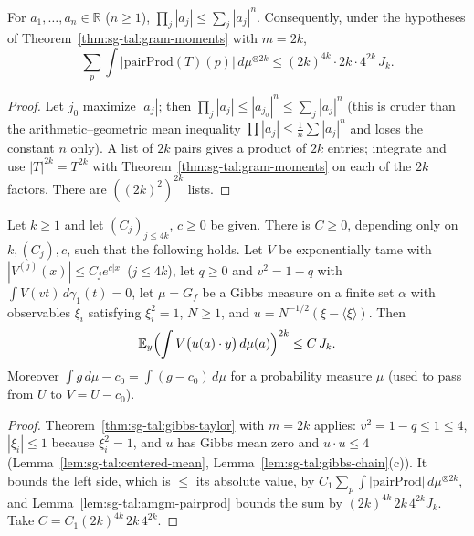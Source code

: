 \begin{lemma}
\label{lem:sg-tal:amgm-pairprod}
  \leanok
{}
For $a_1,\dots,a_n\in\mathbb R$ ($n\ge1$), $\prod_j|a_j|\le\sum_j|a_j|^n$.  Consequently, under the hypotheses of Theorem~\ref{thm:sg-tal:gram-moments} with $m=2k$,
\[
\sum_{p}\int\bigl|\mathrm{pairProd}(T)(p)\bigr|\,d\mu^{\otimes2k}\le(2k)^{4k}\cdot2k\cdot4^{2k}\,J_k .
\]
\end{lemma}
\begin{proof}
  \leanok
Let $j_0$ maximize $|a_j|$; then $\prod_j|a_j|\le|a_{j_0}|^n\le\sum_j|a_j|^n$ (this is cruder than the arithmetic--geometric mean inequality $\prod|a_j|\le\frac1n\sum|a_j|^n$ and loses the constant $n$ only).  A list of $2k$ pairs gives a product of $2k$ entries; integrate and use $|T|^{2k}=T^{2k}$ with Theorem~\ref{thm:sg-tal:gram-moments}
on each of the $2k$ factors.  There are $((2k)^2)^{2k}$ lists.
\end{proof}

\begin{theorem}
\label{thm:sg-tal:gibbs-fluct-core}
  \leanok
{}
Let $k\ge1$ and let $(C_j)_{j\le4k}$, $c\ge0$ be given.  There is $C\ge0$, depending only on $k,(C_j),c$, such that the following holds.  Let $V$ be exponentially tame with $|V^{(j)}(x)|\le C_je^{c|x|}$ ($j\le4k$), let $q\ge0$ and $v^2=1-q$ with $\int V(vt)\,d\gamma_1(t)=0$, let $\mu=G_f$ be a Gibbs measure on a finite set $\alpha$ with observables $\xi_i$ satisfying $\xi_i^2=1$, $N\ge1$, and $u=N^{-1/2}(\xi-\langle\xi\rangle)$.  Then
\[
\mathbb E_y\Bigl(\int V\bigl(u(a)\cdot y\bigr)\,d\mu(a)\Bigr)^{2k}\le C\,J_k .
\]
Moreover $\int g\,d\mu-c_0=\int(g-c_0)\,d\mu$ for a probability measure $\mu$ (used to pass from $U$ to $V=U-c_0$).
\end{theorem}
\begin{proof}
  \leanok
Theorem~\ref{thm:sg-tal:gibbs-taylor} with $m=2k$ applies: $v^2=1-q\le1\le4$, $|\xi_i|\le1$ because $\xi_i^2=1$, and $u$ has Gibbs mean zero and $u\cdot u\le4$ (Lemma~\ref{lem:sg-tal:centered-mean}, Lemma~\ref{lem:sg-tal:gibbs-chain}(c)).  It bounds the left side, which is $\le$ its absolute value, by $C_1\sum_p\int|\mathrm{pairProd}|\,d\mu^{\otimes2k}$, and Lemma~\ref{lem:sg-tal:amgm-pairprod} bounds the sum by $(2k)^{4k}\,2k\,4^{2k}J_k$.  Take $C=C_1(2k)^{4k}\,2k\,4^{2k}$.
\end{proof}

